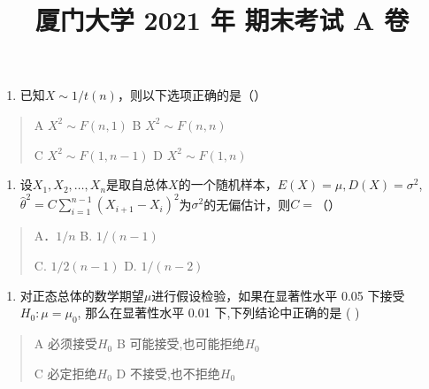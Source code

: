 \documentclass[fontset=exam]{exam-zh}
\title{厦门大学 2021 年 期末考试 A 卷}
\begin{document}
\maketitle
{}

\par{}\smallskip

\begin{enumerate}
\def\labelenumi{\arabic{enumi}.}
\item
  已知\(X\sim1/t(n)\)，则以下选项正确的是（）
\end{enumerate}

\begin{quote}
A \(X^2\sim F(n,1)\) B \(X^2\sim F(n,n)\)

C \(X^2\sim F(1,n-1)\) D \(X^2\sim F(1,n)\)
\end{quote}

\begin{enumerate}
\def\labelenumi{\arabic{enumi}.}
\setcounter{enumi}{1}
\item
  设\(X_1,X_2,\ldots,X_n\)是取自总体\(X\)的一个随机样本，\(E(X)=\mu,D(X)=\sigma^2\), \(\widehat\theta^2=C\sum_{i=1}^{n-1}(X_{i+1}-X_i)^2\)为\(\sigma^2\)的无偏估计，则\(C=\)（）
\end{enumerate}

\begin{quote}
A．\(1/n\) B. \(1/(n-1)\)

C. \(1/2(n-1)\) D. \(1/(n-2)\)
\end{quote}

\begin{enumerate}
\def\labelenumi{\arabic{enumi}.}
\setcounter{enumi}{2}
\item
  对正态总体的数学期望\(\mu\)进行假设检验，如果在显著性水平 0.05 下接受\(H_0:\mu=\mu_0\), 那么在显著性水平 0.01 下,下列结论中正确的是 ( )
\end{enumerate}

\begin{quote}
A 必须接受\(H_0\) B 可能接受,也可能拒绝\(H_0\)

C 必定拒绝\(H_0\) D 不接受,也不拒绝\(H_0\)
\end{quote}
\end{document}
